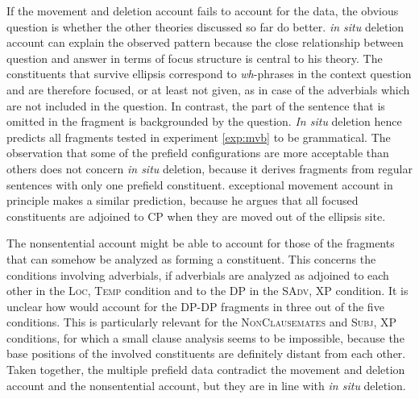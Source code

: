 If the movement and deletion account fails to account for the data, the obvious question is whether the other theories discussed so far do better.  \textit{in situ} deletion account can explain the observed pattern because the close relationship between question and answer in terms of focus structure is central to his theory. The constituents that survive ellipsis correspond to \textit{wh}-phrases in the context question and are therefore focused, or at least not given, as in case of the adverbials which are not included in the question. In contrast, the part of the sentence that is omitted in the fragment is backgrounded by the question. \textit{In situ} deletion hence predicts all fragments tested in experiment \ref{exp:mvb} to be grammatical. The observation that some of the prefield configurations are more acceptable than others does not concern \textit{in situ} deletion, because it derives fragments from regular sentences with only one prefield constituent.  exceptional movement account in principle makes a similar prediction, because he argues that all focused constituents are adjoined to CP when they are moved out of the ellipsis site.

The nonsentential account might be able to account for those of the fragments that can somehow be analyzed as forming a constituent. This concerns the conditions involving adverbials, if adverbials are analyzed as adjoined to each other in the \textsc{Loc, Temp} condition and to the DP in the \textsc{SAdv, XP} condition. It is unclear how \citet{barton.progovac2005} would account for the DP-DP fragments in three out of the five conditions. This is particularly relevant for the \textsc{NonClausemates} and \textsc{Subj, XP} conditions, for which a small clause analysis seems to be impossible, because the base positions of the involved constituents are definitely distant from each other. Taken together, the multiple prefield data contradict the movement and deletion account and the nonsentential account, but they are in line with \textit{in situ} deletion.

